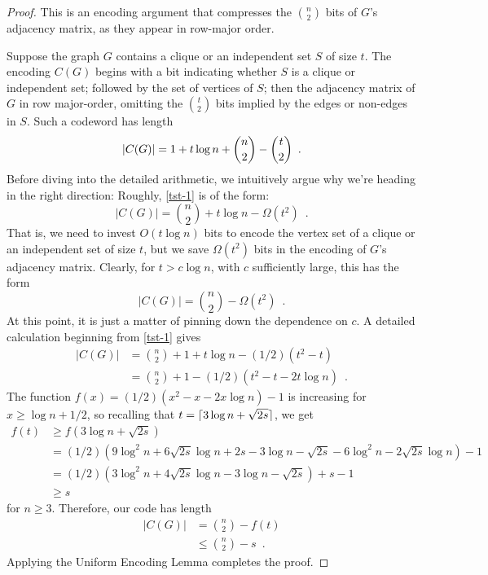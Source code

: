 \documentclass[prodmode,acmcsur]{acmsmall}
\begin{document}
\begin{proof}
  This is an encoding argument that compresses the $\binom{n}{2}$ bits
  of $G$'s adjacency matrix, as they appear in row-major order.
  
  Suppose the graph $G$ contains a clique or an independent set $S$ of size
  $t$. The encoding $C(G)$ begins with a bit indicating whether $S$
  is a clique or independent set; followed by the set of vertices of $S$; 
  then the
  adjacency matrix of $G$ in row major-order, omitting
  the $\binom{t}{2}$ bits implied by the edges or non-edges in
  $S$. Such a codeword has length
  \begin{equation} 
    |C(G)|  = 1 + t\log n + \binom{n}{2}-\binom{t}{2} \enspace .  
    \eqlabel{tst-1}
  \end{equation}
  Before diving into the detailed arithmetic, we intuitively
  argue why we're heading in the right direction: Roughly,
  \eqref{tst-1} is of the form:
  \[ |C(G)|  = \binom{n}{2} + t\log n - \varOmega(t^2) \enspace . \]
  That is, we need to invest $O(t\log n)$ bits
  to encode the vertex set of a clique or an independent set of 
  size $t$, but we save $\varOmega(t^2)$ bits in the encoding of $G$'s 
  adjacency matrix.
  Clearly, for $t>c\log n$, with $c$ sufficiently large, this has the form 
  \[ |C(G)|  = \binom{n}{2} - \varOmega(t^2) \enspace . \]
  At this point, it is just a matter of pinning down the dependence on $c$.
  A detailed calculation beginning from \eqref{tst-1} gives
  \begin{align*}
    |C(G)| 
    & = \binom{n}{2} + 1 + t\log n - (1/2)(t^2 - t) \\
    & = \binom{n}{2} + 1 - (1/2)(t^2 - t - 2t \log n) \enspace .
  \end{align*}
  The function $f(x) = (1/2)(x^2 - x - 2x \log n) - 1$ is increasing
  for $x \geq \log n + 1/2$, so recalling that
$t = {\lceil 3\log n + \sqrt{2s} \rceil}$, we get
  \begin{align*}
    f(t) &\ge f(3\log n + \sqrt{2s}) \\
    &= (1/2)(9 \log^2 n + 6 \sqrt{2s} \log n + 2s - 3 \log n - \sqrt{2s} - 6 \log^2 n - 2 \sqrt{2s} \log n) - 1 \\
    &= (1/2)(3 \log^2 n + 4 \sqrt{2s} \log n - 3 \log n - \sqrt{2s}) + s - 1 \\
    &\ge s
  \end{align*}
  for $n \ge 3$. Therefore, our code has length
  \begin{align*}
    |C(G)| & = \binom{n}{2} - f(t) \\
    & \le \binom{n}{2} - s \enspace .
  \end{align*}
  Applying the Uniform Encoding Lemma completes the proof.
\end{proof}
\end{document}
